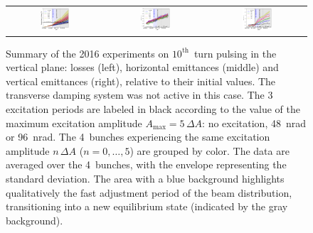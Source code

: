\documentclass[%
 reprint,
 amsmath,amssymb,
 aps,
prstab,
longbibliography
]{revtex4-1}
\begin{document}
\begin{figure}
  \begin{tabular}{ccc}
    \includegraphics[width=0.32\textwidth]{2016_bunch_intensity_v10th_no_damper_avg.png}&
    \includegraphics[width=0.32\textwidth]{2016_emith_avg_rel_v10th_no_damper.png}&
    \includegraphics[width=0.32\textwidth]{2016_emitv_avg_rel_v10th_no_damper.png}\\
  \end{tabular}
  \caption{Summary of the 2016 experiments on $10^{\mathrm{th}}$~turn
    pulsing in the vertical plane: losses (left), horizontal
    emittances (middle) and vertical emittances (right), relative to
    their initial values. The transverse damping system was not active
    in this case. The 3 excitation periods are labeled in black
    according to the value of the maximum excitation amplitude
    $A_{\mathrm{max}} = 5 \, \Delta A$: no excitation, 48~nrad or
    96~nrad. The 4~bunches experiencing the same excitation amplitude
    $n \, \Delta A$ ($n = 0, \ldots, 5$) are grouped by color. The
    data are averaged over the 4~bunches, with the envelope
    representing the standard deviation. The area with a blue
    background highlights qualitatively the fast adjustment period of
    the beam distribution, transitioning into a new equilibrium state
    (indicated by the gray background).}
  \label{fig:10thexp}
\end{figure}
\end{document}
